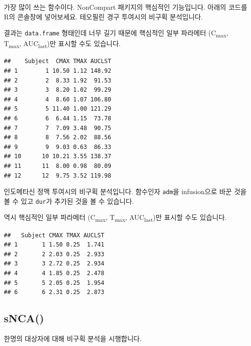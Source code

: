 \documentclass[
  11pt,
  krantz2, a4paper, twoside]{krantz}
\begin{document}
가장 많이 쓰는 함수이다.
NonCompart 패키지의 핵심적인 기능입니다.
아래의 코드를 R의 콘솔창에 넣어보세요.
테오필린 경구 투여시의 비구획 분석입니다.

결과는 \texttt{data.frame} 형태인데 너무 길기 때문에 핵심적인 일부 파라메터 (C\textsubscript{max}, T\textsubscript{max}, AUC\textsubscript{last})만 표시할 수도 있습니다.

\begin{verbatim}
##    Subject  CMAX TMAX AUCLST
## 1        1 10.50 1.12 148.92
## 2        2  8.33 1.92  91.53
## 3        3  8.20 1.02  99.29
## 4        4  8.60 1.07 106.80
## 5        5 11.40 1.00 121.29
## 6        6  6.44 1.15  73.78
## 7        7  7.09 3.48  90.75
## 8        8  7.56 2.02  88.56
## 9        9  9.03 0.63  86.33
## 10      10 10.21 3.55 138.37
## 11      11  8.00 0.98  80.09
## 12      12  9.75 3.52 119.98
\end{verbatim}

인도메타신 정맥 투여시의 비구획 분석입니다.
함수인자 \texttt{adm}을 infusion으로 바꾼 것을 볼 수 있고 \texttt{dur}가 추가된 것을 볼 수 있습니다.

역시 핵심적인 일부 파라메터 (C\textsubscript{max}, T\textsubscript{max}, AUC\textsubscript{last})만 표시할 수도 있습니다.

\begin{verbatim}
##   Subject CMAX TMAX AUCLST
## 1       1 1.50 0.25  1.741
## 2       2 2.03 0.25  2.933
## 3       3 2.72 0.25  2.934
## 4       4 1.85 0.25  2.478
## 5       5 2.05 0.25  1.954
## 6       6 2.31 0.25  2.873
\end{verbatim}

\hypertarget{snca}{%
\subsection{sNCA()}\label{snca}}

한명의 대상자에 대해 비구획 분석을 시행합니다.
\end{document}
